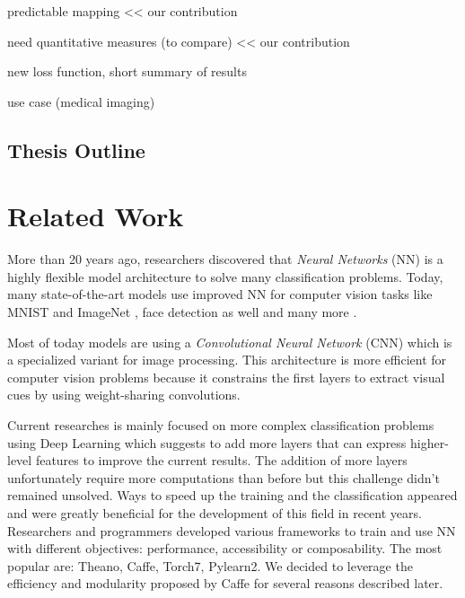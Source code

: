 \documentclass[a4paper,12pt]{report}
\begin{document}
predictable mapping << our contribution

need quantitative measures (to compare) << our contribution

new loss function, short summary of results

use case (medical imaging)

\section{Thesis Outline}


\chapter{Related Work}

More than 20 years ago, researchers discovered that {\em Neural Networks} (NN) is a highly flexible model architecture to solve many classification problems.
Today, many state-of-the-art models use improved NN for computer vision tasks like MNIST \cite{mnist_web} and ImageNet \cite{krizhevsky2012imagenet}, face detection as well \cite{rowley1998neural} and many more \cite{prechelt1994proben1}.

Most of today models are using a {\em Convolutional Neural Network} (CNN) which is a specialized variant for image processing.
This architecture is more efficient for computer vision problems because it constrains the first layers to extract visual cues by using weight-sharing convolutions.

Current researches is mainly focused on more complex classification problems using Deep Learning which suggests to add more layers that can express higher-level features to improve the current results.
The addition of more layers unfortunately require more computations than before but this challenge didn't remained unsolved.
Ways to speed up the training and the classification appeared and were greatly beneficial for the development of this field in recent years\cite{ciresan2011flexible}.
Researchers and programmers developed various frameworks to train and use NN with different objectives: performance, accessibility or composability.
The most popular are: Theano\cite{bastien2012theano}, Caffe\cite{jia2014caffe}, Torch7\cite{collobert2011torch7}, Pylearn2\cite{goodfellow2013pylearn2}.
We decided to leverage the efficiency and modularity proposed by Caffe for several reasons described later.
\end{document}
